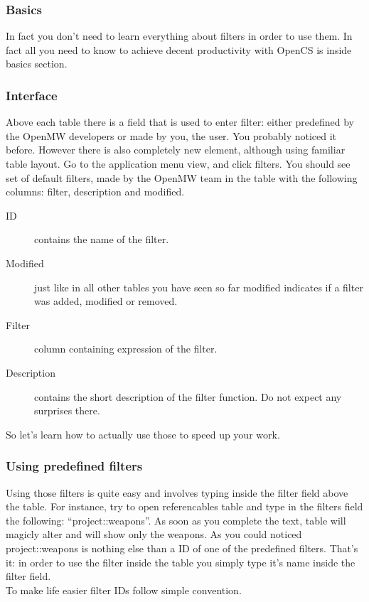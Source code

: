\subsubsection{Basics}
In fact you don't need to learn everything about filters in order to use them. In fact all you need to know to achieve decent productivity with OpenCS is inside basics section.

\subsubsection{Interface}
Above each table there is a field that is used to enter filter: either predefined by the OpenMW developers or made by you, the user. You probably noticed it before. However there is also completely new element, although using familiar table layout. Go to the application menu view, and click filters. You should see set of default filters, made by the OpenMW team in the table with the following columns: filter, description and modified.

\begin{description}
 \item[ID] contains the name of the filter.
 \item[Modified] just like in all other tables you have seen so far modified indicates if a filter was added, modified or removed.
 \item[Filter] column containing expression of the filter.
 \item[Description] contains the short description of the filter function. Do not expect any surprises there.
\end{description}

So let's learn how to actually use those to speed up your work.
\subsubsection{Using predefined filters}
Using those filters is quite easy and involves typing inside the filter field above the table. For instance, try to open referencables table and type in the filters field the following: ``project::weapons''. As soon as you complete the text, table will magicly alter and will show only the weapons. As you could noticed project::weapons is nothing else than a ID of one of the predefined filters. That's it: in order to use the filter inside the table you simply type it's name inside the filter field.\\
To make life easier filter IDs follow simple convention. 

